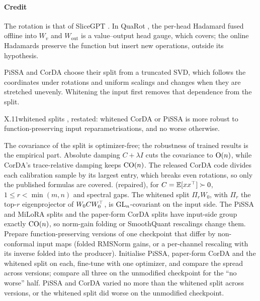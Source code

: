 \paragraph{Credit}
The rotation is that of SliceGPT \citep{xashkboos2024slicegpt}. In QuaRot \citep{xashkboos2024quarot}, the per-head
Hadamard fused offline into $W_v$ and $W_{\mathrm{out}}$ is a value--output head gauge, which
 covers; the online Hadamards preserve the function but insert new operations, outside its
hypothesis.

PiSSA and CorDA choose their split from a truncated SVD, which follows the coordinates under rotations and uniform
scalings and changes when they are stretched unevenly. Whitening the input first removes that dependence from the split.

\begin{prediction}{X.11}{whitened splits}
, restated: whitened CorDA or PiSSA is more robust to function-preserving input
reparametrisations, and no worse otherwise.
\begin{predmeta}
   The covariance of the split is optimizer-free; the robustness of trained results is the empirical
    part. Absolute damping $C+\lambda I$ cuts the covariance to $\mathrm{O}(n)$, while CorDA's trace-relative damping keeps
    $\mathrm{CO}(n)$. The released CorDA code divides each calibration sample by its largest entry, which breaks even rotations,
    so only the published formulas are covered.
    (repaired), for $C=\mathbb E[xx^{\top}]\succ0$, $1\le r<\min(m,n)$ and
    spectral gaps. The whitened split $\Pi_rW_0$, with $\Pi_r$ the top-$r$ eigenprojector of $W_0CW_0^{\top}$, is
    $\mathrm{GL}_n$-covariant on the input side. The PiSSA and MiLoRA splits and the paper-form CorDA splits have input-side
    group exactly $\mathrm{CO}(n)$, so norm-gain folding or SmoothQuant rescalings change them.
   Prepare function-preserving versions of one checkpoint that differ by non-conformal input maps
    (folded RMSNorm gains, or a per-channel rescaling with its inverse folded into the producer). Initialise PiSSA,
    paper-form CorDA and the whitened split on each, fine-tune with one optimizer, and compare the spread across
    versions; compare all three on the unmodified checkpoint for the ``no worse'' half.
   PiSSA and CorDA varied no more than the whitened split across versions, or the whitened
    split did worse on the unmodified checkpoint.
\end{predmeta}
\end{prediction}

